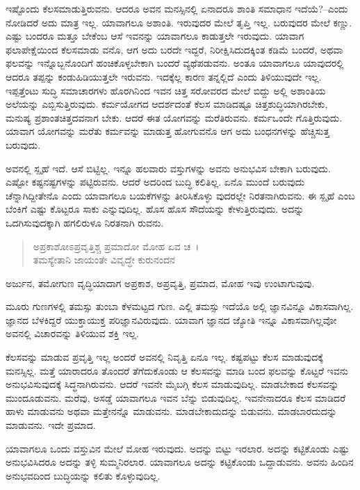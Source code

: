 ಇಷ್ಟೊಂದು ಕೆಲಸಮಾಡುತ್ತಿರುವನು. ಆದರೂ ಅವನ ಮನಸ್ಸಿನಲ್ಲಿ ಏನಾದರೂ ಶಾಂತಿ ಸಮಾಧಾನ ಇದೆಯೆ?--ಎಂದು ನೋಡಿದರೆ ಅದು ಮಾತ್ರ ಇಲ್ಲ. ಯಾವಾಗಲೂ ಅಶಾಂತಿ. ಇರುವುದರ ಮೇಲೆ ತೃಪ್ತಿ ಇಲ್ಲ. ಬರುವುದರ ಮೇಲೆ ಕಣ್ಣು. ಎಷ್ಟು ಬಂದರೂ ಮತ್ತೂ ಬೇಕೆಂಬ ಆಸೆ ಇವನನ್ನು ಯಾವಾಗಲೂ ಕಾಡುತ್ತಲೇ ಇರುವುದು. ಯಾವಾಗ ಫಲಾಪೇಕ್ಷೆಯಿಂದ ಕೆಲಸಮಾಡು ವನೊ, ಆಗ ಅದು ಬರದೇ ಇದ್ದರೆ, ನಿರೀಕ್ಷಿಸಿದುದಕ್ಕಿಂತ ಕಡಿಮೆ ಬಂದರೆ, ಅಥವಾ ಫಲವನ್ನು ಇನ್ನೊಬ್ಬನೊಂದಿಗೆ ಹಂಚಿಕೊಳ್ಳಬೇಕಾಗಿ ಬಂದರೆ ವ್ಯಥೆಪಡುವನು. ಅಂತೂ ಯಾವಾಗಲೂ ಯಾವುದರಲ್ಲಿ ಆದರೂ ತಪ್ಪನ್ನು ಕಂಡುಹಿಡಿಯುತ್ತಲೇ ಇರುವನು. ಇದಕ್ಕೆಲ್ಲ ಕಾರಣ ತನ್ನಲ್ಲಿದೆ ಎಂದು ತಿಳಿಯುವುದೇ ಇಲ್ಲ. ಇಪ್ಪತ್ತೆಂಟು ಸುದ್ಧಿ ಸಮಾಚಾರಗಳು ಹೊರಗಿನಿಂದ ಇವನ ಚಿತ್ತ ಸರೋವರದ ಮೇಲೆ ಬಿದ್ದು ಅಲ್ಲಿ ಅಶಾಂತಿಯ ಅಲೆಯನ್ನು ಎಬ್ಬಿಸುತ್ತಿರುವುದು. ಕರ್ಮಯೋಗದ ಆದರ್ಶದಂತೆ ಕೆಲಸ ಮಾಡಿದಷ್ಟೂ ಚಿತ್ತಶುದ್ಧಿಯಾಗಿರಬೇಕು, ಮನುಷ್ಯ ಪ್ರಶಾಂತಚಿತ್ತದವನಾಗ ಬೇಕು. ಆದರೆ ಈತ ಯೋಗವನ್ನು ಮರೆತಿರುವನು. ಕರ್ಮಒಂದೇ ಗೊತ್ತಿರುವುದು. ಯಾವಾಗ ಯೋಗವನ್ನು ಮರೆತು ಕರ್ಮವನ್ನು ಮಾಡುತ್ತ ಹೋಗುವನೊ ಆಗ ಅದು ಬಂಧನಗಳನ್ನು ಹೆಚ್ಚಿಸುತ್ತ ಬರುವುದು.

ಅವನಲ್ಲಿ ಸ್ಪೃಹೆ ಇದೆ. ಆಸೆ ಬಿಟ್ಟಿಲ್ಲ. ಇನ್ನೂ ಹಲವಾರು ವಸ್ತುಗಳನ್ನು ಅವನು ಅನುಭವಿಸ ಬೇಕಾಗಿ ಬರುವುದು. ಎಷ್ಟೋ ಕಷ್ಟನಷ್ಟಗಳನ್ನು ಪಟ್ಟಿರುವನು. ಆದರೆ ಅದರಿಂದ ಬುದ್ಧಿ ಕಲಿತಿಲ್ಲ. ಏನೊ ಮುಂದೆ ಬರುವುದು ಚೆನ್ನಾಗಿದ್ದೀತೇನೊ ಎಂದು ಯಾವಾಗಲೂ ಬಯಕೆಗಳನ್ನು ತೀರಿಸಿಕೊಳ್ಳು ವುದರಲ್ಲೇ ನಿರತನಾಗಿರುವನು. ಈ ಸ್ಪೃಹೆ ಎಂಬ ಬೆಂಕಿಗೆ ಎಷ್ಟು ಕೊಟ್ಟರೂ ಸಾಕು ಎನ್ನುವುದಿಲ್ಲ. ಹೊಸ ಹೊಸ ಸೌದೆಯನ್ನು ಕೇಳುತ್ತಿರುವುದು. ಅದನ್ನು ಒದಗಿಸುವುದಕ್ಕಾಗಿ ಹಗಲಿರುಳೂ ನಿರತನಾಗಿ ರುವನು.

\begin{verse}
ಅಪ್ರಕಾಶೋಽಪ್ರವೃತ್ತಿಶ್ಚ ಪ್ರಮಾದೋ ಮೋಹ ಏವ ಚ~।\\ತಮಸ್ಯೇತಾನಿ ಜಾಯಂತೇ ವಿವೃದ್ಧೇ ಕುರುನಂದನ 
\end{verse}

{\small ಅರ್ಜುನ, ತಮೋಗುಣ ವೃದ್ಧಿಯಾದಾಗ ಅಪ್ರಕಾಶ, ಅಪ್ರವೃತ್ತಿ, ಪ್ರಮಾದ, ಮೋಹ ಇವು ಉಂಟಾಗುವುವು.}

ಮೂರು ಗುಣಗಳಲ್ಲಿ ತಮಸ್ಸು ತುಂಬಾ ಕೆಳಮಟ್ಟದ ಗುಣ. ಎಲ್ಲಿ ತಮಸ್ಸು ಇದೆಯೊ ಅಲ್ಲಿ ಜ್ಞಾನವಿನ್ನೂ ವಿಕಾಸವಾಗಿಲ್ಲ. ಜ್ಞಾನದ ಬೆಳಕಿದ್ದರೆ ಯುಕ್ತಾಯುಕ್ತ ಪರಿಜ್ಞಾನವಿರುವುದು. ಯಾವಾಗ ಜ್ಞಾನದ ಜ್ಯೋತಿ ಇನ್ನೂ ವಿಕಾಸವಾಗಿಲ್ಲವೋ ಅವನಲ್ಲಿ ವಿಚಾರವನ್ನು ತಿಳಿಯುವ ಶಕ್ತಿ ಇಲ್ಲ.

ಕೆಲಸವನ್ನು ಮಾಡುವ ಪ್ರವೃತ್ತಿ ಇಲ್ಲ ಅಂದರೆ ಅವನಲ್ಲಿ ನಿವೃತ್ತಿ ಏನೂ ಇಲ್ಲ. ಕಷ್ಟಪಟ್ಟು ಕೆಲಸ ಮಾಡುವುದಕ್ಕೆ ಮನಸ್ಸಿಲ್ಲ. ಮತ್ತೆ ಯಾರಾದರೂ ತೊಂದರೆ ತೆಗೆದುಕೊಂಡು ಆ ಕೆಲಸವನ್ನು ಮಾಡಿ ಬಂದ ಫಲವನ್ನು ಕೊಟ್ಟರೆ ಇವನು ಅನುಭವಿಸುವುದಕ್ಕೆ ಸಿದ್ಧನಾಗಿರುವನು. ಆದರೆ ಇವನೇ ಮೈಬಗ್ಗಿ ಕೆಲಸ ಮಾಡುವುದಿಲ್ಲ. ಮಾಡಬೇಕಾದ ಕೆಲಸವನ್ನು ಮುಂದೂಡುವನು. ಮರೆವು, ಅಸಡ್ಡೆ ಯಾವಾಗಲೂ ಇವನ ಬೆನ್ನು ಬಿಡುವುದಿಲ್ಲ. ಇವನೇನಾದರೂ ಕೆಲಸ ಮಾಡಿದರೆ ಹಾಳು ಮಾಡುವನು ಅಥವಾ ಮತ್ತೇನನ್ನೊ ಮಾಡುವನು. ಮಾಡಬೇಕಾದುದನ್ನು ಬಿಡುವನು. ಮಾಡಬಾರದುದನ್ನು ಮಾಡುವನು. ಇದೇ ಪ್ರಮಾದ.

ಯಾವಾಗಲೂ ಒಂದು ವಸ್ತುವಿನ ಮೇಲೆ ಮೋಹ ಇರುವುದು. ಅದನ್ನು ಬಿಟ್ಟು ಇರಲಾರ. ಅದನ್ನು ಕಟ್ಟಿಕೊಂಡು ಎಷ್ಟು ಅನುಭವಿಸಿದರೂ ಅದನ್ನು ತಳ್ಳಿ ಸುಮ್ಮನಿರಲಾರ. ಯಾವಾಗಲೂ ಅದನ್ನು ಕಟ್ಟಿಕೊಂಡು ಒದ್ದಾಡುವನು. ಅವನು ಹಿಂದಿನ ಅನುಭವದಿಂದ ಬುದ್ಧಿಯನ್ನು ಕಲಿತು ಕೊಳ್ಳುವುದಿಲ್ಲ.

